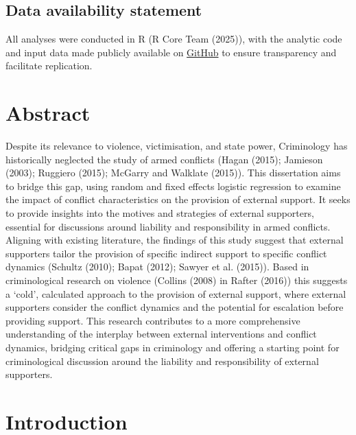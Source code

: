 \documentclass[
]{article}
\begin{document}
\subsection{Data availability
statement}\label{data-availability-statement}

All analyses were conducted in R (R Core Team (2025)), with the analytic
code and input data made publicly available on
\href{https://github.com/celine-felicit/Dissertation-Code}{GitHub} to
ensure transparency and facilitate replication.

\section{Abstract}\label{abstract}

Despite its relevance to violence, victimisation, and state power,
Criminology has historically neglected the study of armed conflicts
(Hagan (2015); Jamieson (2003); Ruggiero (2015); McGarry and Walklate
(2015)). This dissertation aims to bridge this gap, using random and
fixed effects logistic regression to examine the impact of conflict
characteristics on the provision of external support. It seeks to
provide insights into the motives and strategies of external supporters,
essential for discussions around liability and responsibility in armed
conflicts. Aligning with existing literature, the findings of this study
suggest that external supporters tailor the provision of specific
indirect support to specific conflict dynamics (Schultz (2010); Bapat
(2012); Sawyer et al. (2015)). Based in criminological research on
violence (Collins (2008) in Rafter (2016)) this suggests a `cold',
calculated approach to the provision of external support, where external
supporters consider the conflict dynamics and the potential for
escalation before providing support. This research contributes to a more
comprehensive understanding of the interplay between external
interventions and conflict dynamics, bridging critical gaps in
criminology and offering a starting point for criminological discussion
around the liability and responsibility of external supporters.

\newpage

\section{Introduction}\label{introduction}
\end{document}
